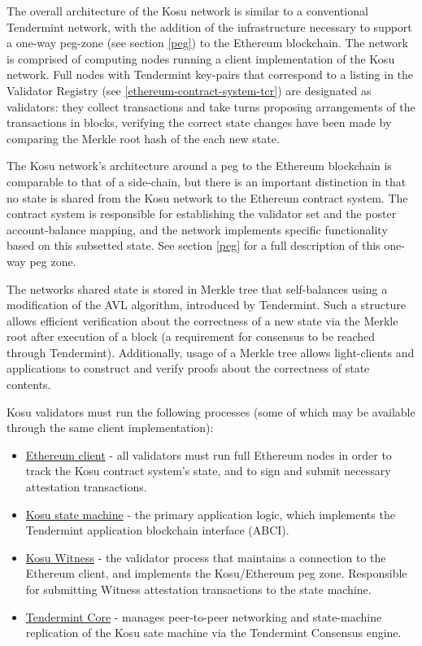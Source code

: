\documentclass[10pt]{article}
\begin{document}
The overall architecture of the Kosu network is similar to a conventional Tendermint network, with the addition of the infrastructure necessary to support a one-way peg-zone (see section \ref{peg}) to the Ethereum blockchain. The network is comprised of computing nodes running a client implementation of the Kosu network. Full nodes with Tendermint key-pairs that correspond to a listing in the Validator Registry (see \ref{ethereum-contract-system-tcr}) are designated as validators: they collect transactions and take turns proposing arrangements of the transactions in blocks, verifying the correct state changes have been made by comparing the Merkle root hash of the each new state. 
\medskip

The Kosu network’s architecture around a peg to the Ethereum blockchain is comparable to that of a side-chain, but there is an important distinction in that no state is shared from the Kosu network to the Ethereum contract system. The contract system is responsible for establishing the validator set and the poster account-balance mapping, and the network implements specific functionality based on this subsetted state. See section \ref{peg} for a full description of this one-way peg zone.
\medskip

The networks shared state is stored in Merkle tree that self-balances using a modification of the AVL algorithm, introduced by Tendermint\cite{tendermint-iavl}. Such a structure allows efficient verification about the correctness of a new state via the Merkle root after execution of a block (a requirement for consensus to be reached through Tendermint). Additionally, usage of a Merkle tree allows light-clients and applications to construct and verify proofs about the correctness of state contents.
\medskip

Kosu validators must run the following processes (some of which may be available through the same client implementation):

\begin{itemize}
  \item \underline{Ethereum client} - all validators must run full Ethereum nodes in order to track the Kosu contract system’s state, and to sign and submit necessary attestation transactions.
  \item \underline{Kosu state machine} - the primary application logic, which implements the Tendermint application blockchain interface (ABCI)\cite{tendermint-abci-spec}.
  \item \underline{Kosu Witness} - the validator process that maintains a connection to the Ethereum client, and implements the Kosu/Ethereum peg zone. Responsible for submitting Witness attestation transactions to the state machine.
  \item \underline{Tendermint Core} - manages peer-to-peer networking and state-machine replication of the Kosu sate machine via the Tendermint Consensus engine.
\end{itemize}
\end{document}

